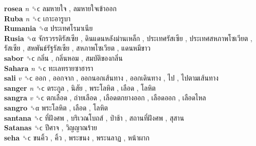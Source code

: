 \textbf{rosea} \emph{n}  ␝ϲ   ลมหายใจ ,  ลมหายใจเข้าออก   \\
\textbf{Ruba} \emph{n}  ␝ϲ   เกาะอารูบา   \\
\textbf{Rumania} ␝α   ประเทศโรมาเนีย   \\
\textbf{Rusia} ␝α   จักรวรรดิรัสเซีย ,  ดินแดนหลังม่านเหล็ก ,  ประเทศรัสเซีย ,  ประเทศสหภาพโซเวียต ,  รัสเซีย ,  สหพันธ์รัฐรัสเซีย ,  สหภาพโซเวียต ,  แดนหมีขาว   \\
\textbf{sabor} ␝ϲ   กลิ่น ,  กลิ่นหอม ,  สมบัติของกลิ่น   \\
\textbf{Sahara} \emph{n}  ␝ϲ   ทะเลทรายซาฮารา   \\
\textbf{sali} \emph{v}  ␝ϲ   ออก ,  ออกจาก ,  ออกนอกเส้นทาง ,  ออกเดินทาง ,  ไป ,  ไปตามเส้นทาง   \\
\textbf{sanger} \emph{n}  ␝ϲ   ตระกูล ,  นิสัย ,  พระโลหิต ,  เลือด ,  โลหิต   \\
\textbf{sangra} \emph{v}  ␝ϲ   ตกเลือด ,  ถ่ายเลือด ,  เลือดตกยางออก ,  เลือดออก ,  เลือดไหล   \\
\textbf{sangro} ␝α   พระโลหิต ,  เลือด ,  โลหิต   \\
\textbf{santana} ␝ϲ   ที่ฝังศพ ,  บริเวณโบถส์ ,  ป่าช้า ,  สถานที่ฝังศพ ,  สุสาน   \\
\textbf{Satanas} ␝ϲ   ปีศาจ ,  วิญญาณร้าย   \\
\textbf{seha} ␝ϲ   ขนคิ้ว ,  คิ้ว ,  พระขนง ,  พระนลาฏ ,  หน้าผาก   \\
